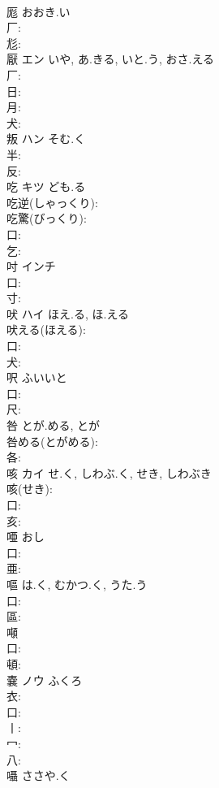 \documentclass[8pt]{extreport}
\begin{document}
\begin{CJK}{UTF8}{min}
\\	厖		おおき.い			
\\	厂: 
\\	尨: 
\\	厭	エン	いや, あ.きる, いと.う, おさ.える		
\\	厂: 
\\	日: 
\\	月: 
\\	犬: 
\\	叛	ハン	そむ.く		
\\	半: 
\\	反: 
\\	吃	キツ	ども.る		
\\	吃逆(しゃっくり): 
\\	吃驚(びっくり): 
\\	口: 
\\	乞: 
\\	吋		インチ			
\\	口: 
\\	寸: 
\\	吠	ハイ	ほえ.る, ほ.える		
\\	吠える(ほえる): 
\\	口: 
\\	犬: 
\\	呎		ふいいと			
\\	口: 
\\	尺: 
\\	咎		とが.める, とが			
\\	咎める(とがめる): 
\\	各: 
\\	咳	カイ	せ.く, しわぶ.く, せき, しわぶき		
\\	咳(せき): 
\\	口: 
\\	亥: 
\\	唖		おし			
\\	口: 
\\	亜: 
\\	嘔		は.く, むかつ.く, うた.う			
\\	口: 
\\	區: 
\\	噸					
\\	口: 
\\	頓: 
\\	嚢	ノウ	ふくろ		
\\	衣: 
\\	口: 
\\	丨: 
\\	冖: 
\\	八: 
\\	囁		ささや.く			

\end{CJK}
\end{document}
